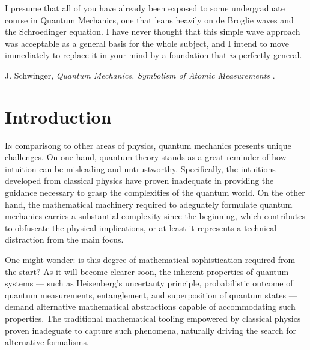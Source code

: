 


\label{chp:fundamentals} 


\begin{refsection}
\begin{quoting}
   \openquote 
   I presume that all of you have already been exposed to some undergraduate
   course in Quantum Mechanics, one that leans heavily on de Broglie waves and
   the Schroedinger equation. I have never thought that this simple wave
   approach was acceptable as a general basis for the whole subject, and I
   intend to move immediately to replace it in your mind by a foundation that
   \emph{is} perfectly general.~\closequote
   \begin{flushright}
       J. Schwinger,
       \emph{Quantum Mechanics. Symbolism of Atomic Measurements}
       \textcite{Schwinger:2001}.
    \end{flushright}
\end{quoting}

\section{Introduction}

\lettrine{I}{n} 
comparisong to other areas of physics, quantum mechanics presents unique challenges.
On one hand, quantum theory stands as a great reminder of how intuition can be misleading and untrustworthy.
 Specifically, the intuitions developed from classical physics have proven inadequate in providing the guidance necessary to grasp the complexities of the quantum world.
  On the other hand, the mathematical machinery required to adeguately formulate quantum mechanics carries a substantial complexity since the beginning, which contributes to obfuscate the physical implications, or at least it represents a technical distraction from the main focus. 

  One might wonder: is this degree of mathematical sophistication required from the start?
  As it will become clearer soon, the inherent properties of quantum systems --- 
  such as Heisenberg's uncertanty principle, probabilistic outcome of 
 quantum measurements, entanglement, and superposition of quantum
  states --- demand alternative mathematical abstractions capable of accommodating 
such properties.  The traditional mathematical tooling empowered by classical physics 
  proven inadeguate to 
capture such phenomena, naturally driving the search for alternative formalisms.


\end{refsection}
